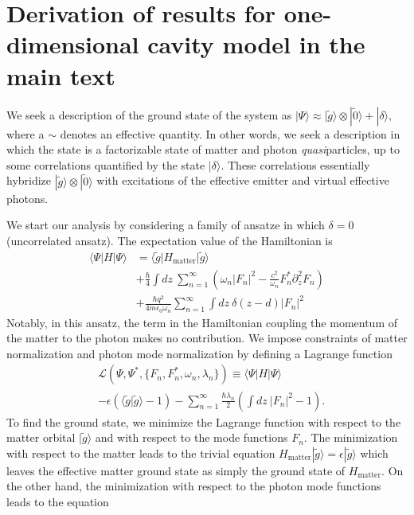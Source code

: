 \documentclass[aps,prb,onecolumn,preprint,
	groupedaddress,superscriptaddress,
	amsfonts,amssymb,amsmath,floatfix,
	citeautoscript]{revtex4-1}
\newcommand{\Jadd}[1]{\textcolor{blue}{#1}}
\begin{document}
\section{Derivation of results for one-dimensional cavity model in the main text}

We seek a description of the ground state of the system as $|\Psi\rangle \approx |\tilde{g}\rangle\otimes|\tilde{0}\rangle + |\delta\rangle,$ where a $\sim$ denotes an effective quantity. In other words, we seek a description in which the state is a factorizable state of matter and photon \textit{quasi}particles, up to some correlations quantified by the state $|\delta\rangle$. These correlations essentially hybridize $|\tilde{g}\rangle\otimes|\tilde{0}\rangle$ with excitations of the effective emitter and virtual effective photons. 

We start our analysis by considering a family of ansatze in which $\delta = 0$ (uncorrelated ansatz).  The expectation value of the Hamiltonian is %
\begin{align}\label{eq:expectation_val1}
\langle \Psi | H | \Psi \rangle &= \langle \tilde{g} |H_{\text{matter}} | \tilde{g}\rangle \nonumber \\ &+ \frac{\hbar}{4}\int dz ~\sum\limits_{n=1}^{\infty}\left(\omega_n|F_n|^2 - \frac{c^2}{\omega_n}F_n^*\partial_z^2F_n\right) \nonumber \\ &+ \frac{\hbar q^2}{4m\epsilon_0\omega_n}\sum\limits_{n=1}^{\infty} \int dz~\delta(z-d)|F_n|^2
\end{align}
Notably, in this ansatz, the term in the Hamiltonian coupling the momentum of the matter to the photon makes no contribution. We impose constraints of matter normalization and photon mode normalization by defining a Lagrange function 
\begin{align}\label{eq:lagrange}
&\mathcal{L}(\Psi, \Psi^*, \{F_n, F_n^*, \omega_n, \lambda_n\}) \equiv \langle \Psi | H | \Psi \rangle \nonumber \\ &- \epsilon(\langle \tilde{g}|\tilde{g}\rangle-1)-\sum\limits_{n=1}^{\infty}\frac{\hbar\lambda_n}{2}\left( \int dz~|F_n|^2-1\right).
\end{align} 
To find the ground state, we minimize the Lagrange function with respect to the matter orbital $|\tilde{g}\rangle$ and with respect to the mode functions $F_n$. The minimization with respect to the matter leads to the trivial equation $H_{\text{matter}} |\tilde{g}\rangle = \epsilon|\tilde{g}\rangle$ which leaves the effective matter ground state as simply the ground state of $H_{\text{matter}}$. On the other hand, the minimization with respect to the photon mode functions leads to  the equation
\end{document}
